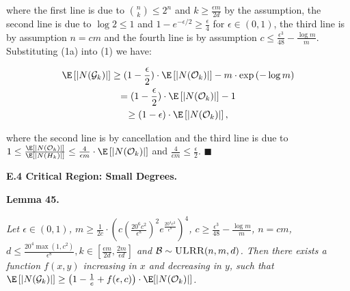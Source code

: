 where the first line is due to $\binom{n}{k}\leq 2^{n}$ and $k\geq\frac{\epsilon m}{2d}$ by the assumption, the second line is due to $\log{2}\leq 1$ and $1-e^{-\epsilon/2}\geq\frac{\epsilon}{4}$ for $\epsilon\in(0,1)$, the third line is by assumption $n=cm$ and the fourth line is by assumption $c\leq\frac{\epsilon^{3}}{48}-\frac{\log{m}}{m}$.
Substituting (1a) into (1) we have:\par


\[\begin{gathered}
\displaystyle\E\left[|N(\mathcal{G}_{k})|\right] \displaystyle\geq(1-\frac{\epsilon}{2})\cdot\E\left[|N(\mathcal{O}_{k})|\right]-m\cdot\exp\left(-\log{m}\right) \\
\displaystyle=(1-\frac{\epsilon}{2})\cdot\E\left[|N(\mathcal{O}_{k})|\right]-1 \\
\displaystyle\geq\left(1-\epsilon\right)\cdot\E\left[|N(\mathcal{O}_{k})|\right],
\end{gathered}\]


where the second line is by cancellation and the third line is due to $1\leq\frac{\E\left[|N(\mathcal{O}_{k})|\right]}{\E\left[|N(H_{k})|\right]}\leq\frac{4}{\epsilon m}\cdot\E\left[|N(\mathcal{O}_{k})|\right]$ and $\frac{4}{\epsilon m}\leq\frac{\epsilon}{2}$.
\ensuremath{\blacksquare}\par






\par\medskip\noindent\textbf{E.4 Critical Region: Small Degrees.}\par





\par\medskip\noindent\textbf{\textbf{Lemma 45}\textbf{.}}\par



\emph{Let $\epsilon\in(0,1)$, $m\geq\frac{1}{2c}\cdot\left(c\left(\frac{20^{6}c^{2}}{\epsilon^{8}}\right)^{2}e^{\frac{20^{4}c^{3}}{\epsilon^{8}}}\right)^{4}$, $c\geq\frac{\epsilon^{3}}{48}-\frac{\log{m}}{m}$, $n=cm$, $d\leq\frac{20^{4}\max(1,c^{2})}{\epsilon^{8}},k\in[\frac{\epsilon m}{2d},\frac{2m}{\epsilon d}]$ and $\mathcal{B}\sim\textsc{ULRR}(n,m,d)$.
Then there exists a function $f(x,y)$ increasing in $x$ and decreasing in $y$, such that $\E\left[|N(\mathcal{G}_{k})|\right]\geq\left(1-\frac{1}{e}+f(\epsilon,c)\right)\cdot\E[|N(\mathcal{O}_{k})|]$.}\par



